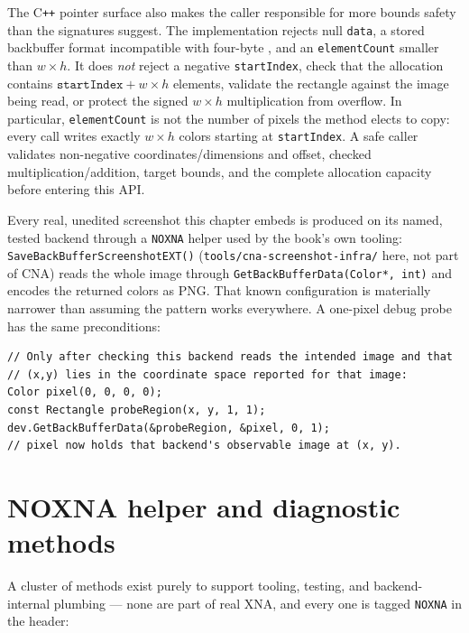 The C\texttt{++} pointer surface also makes the caller responsible for more bounds safety than
the signatures suggest. The implementation rejects null \texttt{data}, a stored
backbuffer format incompatible with four-byte , and an
\texttt{elementCount} smaller than \(w\times h\). It does \emph{not} reject a negative
\texttt{startIndex}, check that the allocation contains
\(\texttt{startIndex}+w\times h\) elements, validate the rectangle against the image being
read, or protect the signed \(w\times h\) multiplication from overflow. In particular,
\texttt{elementCount} is not the number of pixels the method elects to copy: every call
writes exactly \(w\times h\) colors starting at \texttt{startIndex}. A safe caller validates
non-negative coordinates/dimensions and offset, checked multiplication/addition, target
bounds, and the complete allocation capacity before entering this API.

Every real, unedited screenshot this chapter embeds is produced on its named, tested backend
through a \texttt{NOXNA} helper used by the book's own tooling:
\texttt{Save\allowbreak{}Back\allowbreak{}Buffer\allowbreak{}Screenshot\allowbreak{}EXT()}
(\texttt{tools/cna-screenshot-infra/} here, not part of CNA) reads the whole image through
\texttt{GetBackBufferData(Color*, int)} and encodes the returned colors as PNG. That known
configuration is materially narrower than assuming the pattern works everywhere. A one-pixel
debug probe has the same preconditions:

\begin{lstlisting}
// Only after checking this backend reads the intended image and that
// (x,y) lies in the coordinate space reported for that image:
Color pixel(0, 0, 0, 0);
const Rectangle probeRegion(x, y, 1, 1);
dev.GetBackBufferData(&probeRegion, &pixel, 0, 1);
// pixel now holds that backend's observable image at (x, y).
\end{lstlisting}

\section{NOXNA helper and diagnostic methods}
\label{sec:noxna-helpers}

A cluster of methods exist purely to support tooling, testing, and backend-internal plumbing
--- none are part of real XNA, and every one is tagged \texttt{NOXNA} in the header:

